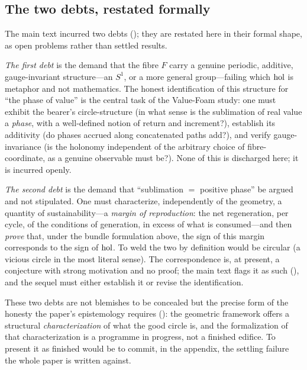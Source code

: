 \subsection{The two debts, restated formally}
\label{p09:sec:app-debts}

The main text incurred two debts (); they are restated here in their formal shape, as open problems rather than settled results.

\emph{The first debt} is the demand that the fibre $F$ carry a genuine periodic, additive, gauge-invariant structure---an $S^1$, or a more general group---failing which $\operatorname{hol}$ is metaphor and not mathematics. The honest identification of this structure for ``the phase of value'' is the central task of the Value-Foam study: one must exhibit the bearer's circle-structure (in what sense is the sublimation of real value a \emph{phase}, with a well-defined notion of return and increment?), establish its additivity (do phases accrued along concatenated paths add?), and verify gauge-invariance (is the holonomy independent of the arbitrary choice of fibre-coordinate, as a genuine observable must be?). None of this is discharged here; it is incurred openly.

\emph{The second debt} is the demand that ``sublimation $=$ positive phase'' be argued and not stipulated. One must characterize, independently of the geometry, a quantity of sustainability---a \emph{margin of reproduction}: the net regeneration, per cycle, of the conditions of generation, in excess of what is consumed---and then \emph{prove} that, under the bundle formulation above, the sign of this margin corresponds to the sign of $\operatorname{hol}$. To weld the two by definition would be circular (a vicious circle in the most literal sense). The correspondence is, at present, a conjecture with strong motivation and no proof; the main text flags it as such (), and the sequel must either establish it or revise the identification.

These two debts are not blemishes to be concealed but the precise form of the honesty the paper's epistemology requires (): the geometric framework offers a structural \emph{characterization} of what the good circle is, and the formalization of that characterization is a programme in progress, not a finished edifice. To present it as finished would be to commit, in the appendix, the settling failure the whole paper is written against.
